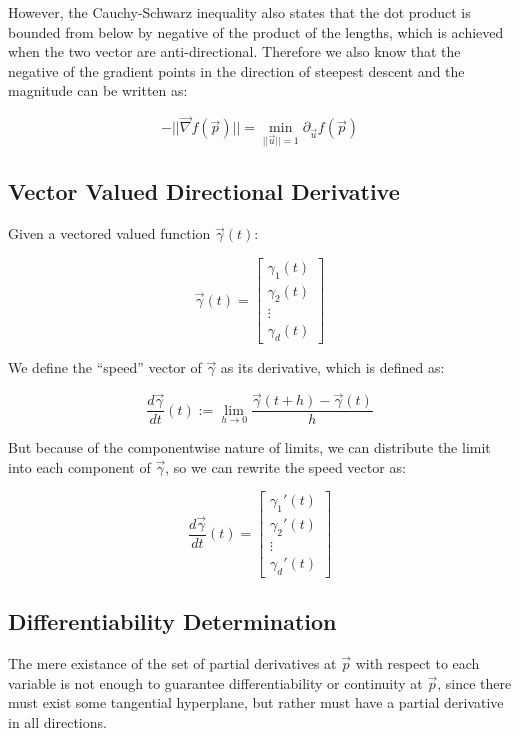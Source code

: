 \documentclass[11 pt, twoside]{article}
\begin{document}
However, the Cauchy-Schwarz inequality also states that the dot product is
bounded from below by negative of the product of the lengths, which is achieved
when the two vector are anti-directional. Therefore we also know that the
negative of the gradient points in the direction of steepest descent and the
magnitude can be written as:

$$-||\vec{\nabla}f(\vec{p})|| = \min_{||\vec{u}|| = 1} \partial_{\vec{u}}
f(\vec{p})$$


\subsection{Vector Valued Directional Derivative}
Given a vectored valued function $\vec{\gamma}(t)$:

\begin{equation*}
\vec{\gamma}(t) = \left[
\begin{array}{c}
\gamma_1 (t)\\
\gamma_2 (t)\\
\vdots\\
\gamma_d (t)
\end{array} \right]
\end{equation*}

We define the ``speed'' vector of $\vec{\gamma}$ as its derivative, which is
defined as:

$$\frac{d\vec{\gamma}}{dt}(t) := \lim_{h\to0} \frac{\vec{\gamma}(t + h) - \vec{\gamma}(t)}{h}$$

But because of the componentwise nature of limits, we can distribute the limit
into each component of $\vec{\gamma}$, so we can rewrite the speed vector as:

\begin{equation*}
\frac{d\vec{\gamma}}{dt}(t) = \left[
\begin{array}{c}
\gamma_1' (t)\\
\gamma_2' (t)\\
\vdots\\
\gamma_d' (t)
\end{array} \right]
\end{equation*}

\subsection{Differentiability Determination}

The mere existance of the set of partial derivatives at $\vec{p}$ with respect to each variable is not enough to guarantee differentiability or continuity at $\vec{p}$, since there must exist some tangential hyperplane, but rather must have a partial derivative in all directions.
\end{document}
